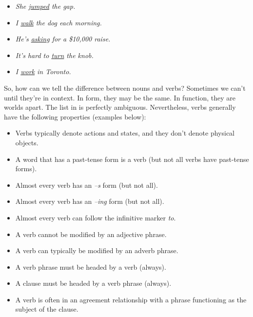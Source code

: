 \begin{itemize}[noitemsep]
    \item \textit{She \uline{jumped} the gap.}
    \item \textit{I \uline{walk} the dog each morning.}
    \item \textit{He's \uline{asking} for a \$10,000 raise.}
    \item \textit{It's hard to \uline{turn} the knob.}
    \item \textit{I \uline{work} in Toronto.}
\end{itemize}
So, how can we tell the difference between nouns and verbs? Sometimes we can't until they're in context. In form, they may be the same. In function, they are worlds apart. The list in  is perfectly ambiguous. Nevertheless, verbs generally have the following properties (examples below):

\begin{itemize}[noitemsep]
    \item {}Verbs typically denote actions and states, and they don't denote physical objects.
    \item {}A word that has a past-tense form is a verb (but not all verbs have past-tense forms).
    \item Almost every verb has an \textit{--s} form (but not all).
    \item Almost every verb has an \textit{--ing} form (but not all).
    \item Almost every verb can follow the infinitive marker \textit{to}.
    \item A verb cannot be modified by an adjective phrase.
    \item {}A verb can typically be modified by an adverb phrase.
    \item A verb phrase must be headed by a verb (always).
    \item {}A clause must be headed by a verb phrase (always).
    \item {}A verb is often in an agreement relationship with a phrase functioning as the subject of the clause.
\end{itemize}

